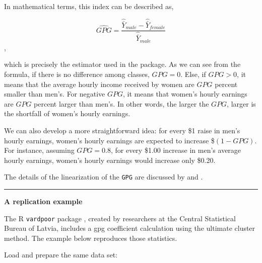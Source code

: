 \documentclass[]{book}
\begin{document}
In mathematical terms, this index can be described as,

\[ \widehat{GPG} = \frac{ \widehat{\bar{Y}}_{male} - \widehat{\bar{Y}}_{female} }{ \widehat{\bar{Y}}_{male} } \],

which is precisely the estimator used in the package. As we can see from
the formula, if there is no difference among classes, \(GPG = 0\). Else,
if \(GPG > 0\), it means that the average hourly income received by
women are \(GPG\) percent smaller than men's. For negative \(GPG\), it
means that women's hourly earnings are \(GPG\) percent larger than
men's. In other words, the larger the \(GPG\), larger is the shortfall
of women's hourly earnings.

We can also develop a more straightforward idea: for every \$1 raise in
men's hourly earnings, women's hourly earnings are expected to increase
\$\((1-GPG)\). For instance, assuming \(GPG = 0.8\), for every \$1.00
increase in men's average hourly earnings, women's hourly earnings would
increase only \$0.20.

The details of the linearization of the \texttt{GPG} are discussed by
\citet{deville1999} and \citet{osier2009}.

\begin{center}\rule{0.5\linewidth}{\linethickness}\end{center}

\textbf{A replication example}

The R \texttt{vardpoor} package \citep{vardpoor}, created by researchers
at the Central Statistical Bureau of Latvia, includes a gpg coefficient
calculation using the ultimate cluster method. The example below
reproduces those statistics.

Load and prepare the same data set:
\end{document}
